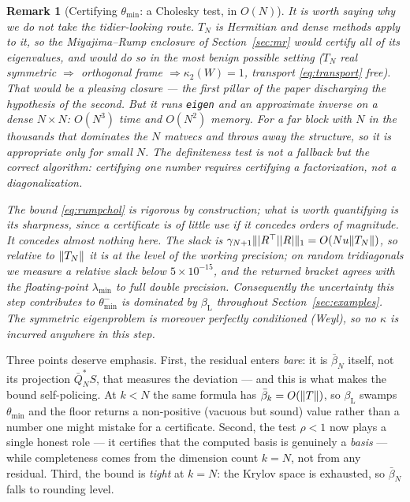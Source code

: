 \documentclass[11pt]{article}
\newtheorem{remark}[theorem]{Remark}
\DeclarePairedDelimiter{\norm}{\lVert}{\rVert}
\DeclarePairedDelimiter{\abs}{\lvert}{\rvert}
\begin{document}
\begin{remark}[Certifying $\theta_{\min}$: a Cholesky test, in $O(N)$]
It is worth saying why we do \emph{not} take the tidier-looking route. $T_N$ is Hermitian and dense
methods apply to it, so the Miyajima--Rump enclosure of Section~\ref{sec:mr} would certify all of its
eigenvalues, and would do so in the most benign possible setting ($T_N$ real symmetric $\Rightarrow$
orthogonal frame $\Rightarrow\kappa_2(W)=1$, transport \eqref{eq:transport} free). That would be a
pleasing closure --- the first pillar of the paper discharging the hypothesis of the second. But it
runs \texttt{eigen} and an approximate inverse on a dense $N\times N$: $O(N^3)$ time and $O(N^2)$
memory. For a far block with $N$ in the thousands that dominates the $N$ matvecs and throws away the
structure, so it is appropriate only for small $N$. The definiteness test is not a fallback but the
correct algorithm: certifying one number requires certifying a factorization, not a diagonalization.

The bound \eqref{eq:rumpchol} is rigorous by construction; what is worth quantifying is its
\emph{sharpness}, since a certificate is of little use if it concedes orders of magnitude. It concedes
almost nothing here. The slack is $\gamma_{N+1}\norm{\abs{R^\top}\abs{R}}_1=O(Nu\norm{T_N})$, so
relative to $\norm{T_N}$ it is at the level of the working precision; on random tridiagonals we measure
a relative slack below $5\times10^{-15}$, and the returned bracket agrees with the floating-point
$\lambda_{\min}$ to full double precision. Consequently the uncertainty this step contributes to
$\theta_{\min}^-$ is dominated by $\beta_{\mathrm L}$ throughout Section~\ref{sec:examples}. The
symmetric eigenproblem is moreover perfectly conditioned (Weyl), so no $\kappa$ is incurred anywhere
in this step.
\end{remark}

Three points deserve emphasis. First, the residual enters \emph{bare}: it is $\bar\beta_N$ itself, not
its projection $\bar Q_N^*S$, that measures the deviation --- and this is what makes the bound
self-policing. At $k<N$ the same formula has $\bar\beta_k=O(\norm{T})$, so $\beta_{\mathrm L}$ swamps
$\theta_{\min}$ and the floor returns a non-positive (vacuous but sound) value rather than a
number one might mistake for a certificate. Second, the test $\rho<1$ now plays a single honest role
--- it certifies that the computed basis is genuinely a \emph{basis} --- while completeness comes from
the dimension count $k=N$, not from any residual. Third, the bound is \emph{tight} at $k=N$: the
Krylov space is exhausted, so $\bar\beta_N$ falls to rounding level.
\end{document}
